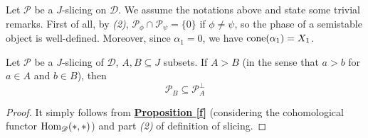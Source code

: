 Let $\mathscr{P}$ be a $J$-slicing on $\mathscr{D}$. We assume the notations above and state some trivial remarks. First of all, by \textit{(2)}, $\mathscr{P}_{\phi}\cap \mathscr{P}_{\psi} = \{ 0 \}$ if $\phi \not = \psi$, so the phase of a semistable object is well-defined. Moreover, since $\alpha_1=0$, we have $\textnormal{cone}(\alpha_1)=X_1$.\\

%

\begin{prop}\label{aa}
Let $\mathscr{P}$ be a $J$-slicing of $\mathscr{D}$, $A,B \subseteq J$ subsets. If $A > B$ (in the sense that $a > b$ for $a \in A$ and $b \in B$), then $$\mathscr{P}_B \subseteq \mathscr{P}_A^{\perp}$$ 
\end{prop}

\begin{proof}
It simply follows from \hyperref[f]{\textbf{Proposition \ref*{f}}} (considering the cohomological functor $\textnormal{Hom}_{\mathscr{D}}(*,*)$) and part \textit{(2)} of definition of slicing. 
\end{proof}

